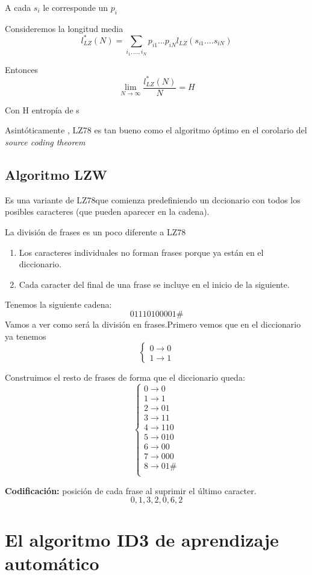 A cada $s_i$ le corresponde un $p_i$ 
\begin{theorem}
	Consideremos la longitud media
	$$l^{*}_{LZ}(N) = \sum_{i_1,...,i_N} p_{i1}...p_{iN} l_{LZ}(s_{i1}....s_{iN})$$
	
	Entonces
	$$\lim_{N\rightarrow \infty} \frac{l^{*}_{LZ}(N)}{N} = H$$
	
	Con H entropía de s
\end{theorem}

\obs Asintóticamente , LZ78 es tan bueno como el algoritmo óptimo en el corolario del \textit{source coding theorem}

\subsection{Algoritmo LZW}

Es una variante de LZ78que comienza predefiniendo un dccionario con todos los posibles caracteres (que pueden aparecer en la cadena).

La división de frases es un poco diferente a LZ78
\begin{enumerate}
	\item Los caracteres individuales no forman frases porque ya están en el diccionario.
	\item Cada caracter del final de una frase se incluye en el inicio de la siguiente.
\end{enumerate}

\begin{example}
	Tenemos la siguiente cadena: 
	$$01110100001\#$$
	Vamos a ver como será la división en frases.Primero vemos que en el diccionario ya tenemos
	$$\begin{cases}
	0 \rightarrow 0\\
	1 \rightarrow 1
	\end{cases}$$
	
	Construimos el resto de frases de forma que el diccionario queda:
		$$\begin{cases}
		0 \rightarrow 0\\
		1 \rightarrow 1\\
		2 \rightarrow 01\\
		3 \rightarrow 11\\
		4 \rightarrow 110\\
		5 \rightarrow 010\\
		6 \rightarrow 00\\
		7 \rightarrow 000\\
		8 \rightarrow 01\#\\
		\end{cases}$$
	
	\textbf{Codificación:} posición de cada frase al suprimir el último caracter.
	$$0,1,3,2,0,6,2$$
\end{example}

\section{El algoritmo ID3 de aprendizaje automático}

